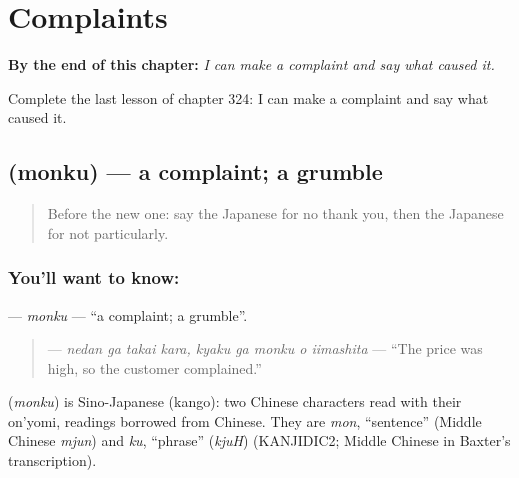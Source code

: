 
\chapter{Complaints}
\label{ch:ja-complaints}

\begin{chapteropening}
\textbf{By the end of this chapter:} \emph{I can make a complaint and say what caused it.}

Complete the last lesson of chapter 324: I can make a complaint and say what caused it.
\end{chapteropening}

\section[\texorpdfstring{\ja{もんく} (monku)}{もんく (monku)}]{ (monku) — a complaint; a grumble}

\label{lesson:JA-C324-monku}



\begin{quote}
Before the new one: say the Japanese for no thank you, then the Japanese for not particularly.
\end{quote}

\subsection*{You'll want to know: }
\textbf{} — \emph{monku} — \textquotedblleft{}a complaint; a grumble\textquotedblright{}.

\begin{quote}
\textbf{   } — \emph{nedan ga takai kara, kyaku ga monku o iimashita} — \textquotedblleft{}The price was high, so the customer complained.\textquotedblright{}
\end{quote}

\begin{cousinweb}
\textbf{} (\emph{monku}) is Sino-Japanese (kango): two Chinese characters read with their on'yomi, readings borrowed from Chinese. They are \emph{mon}, \textquotedblleft{}sentence\textquotedblright{} (Middle Chinese \emph{mjun}) and \emph{ku}, \textquotedblleft{}phrase\textquotedblright{} (\emph{kjuH}) (KANJIDIC2; Middle Chinese in Baxter's transcription).
\end{cousinweb}


